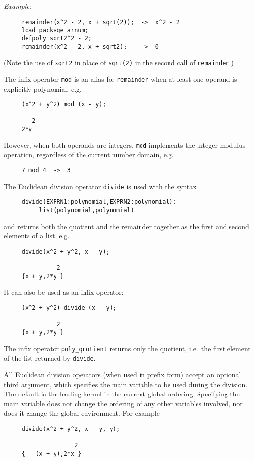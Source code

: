 \textit{Example:}
\begin{verbatim}
     remainder(x^2 - 2, x + sqrt(2));  ->  x^2 - 2
     load_package arnum;
     defpoly sqrt2^2 - 2;
     remainder(x^2 - 2, x + sqrt2);    ->  0
\end{verbatim}
(Note the use of \texttt{sqrt2} in place of \texttt{sqrt(2)} in the
second call of \texttt{remainder}.)

The infix operator \texttt{mod} is an alias for \texttt{remainder}
when at least one operand is explicitly polynomial, e.g.
\begin{verbatim}
     (x^2 + y^2) mod (x - y);

        2
     2*y
\end{verbatim}
However, when both operands are integers, \texttt{mod} implements the
integer modulus operation, regardless of the current number domain,
e.g.
\begin{verbatim}
     7 mod 4  ->  3
\end{verbatim}

The Euclidean division operator \texttt{divide} is used with the syntax
\begin{verbatim}
     divide(EXPRN1:polynomial,EXPRN2:polynomial):
          list(polynomial,polynomial)
\end{verbatim}
and returns both the quotient and the remainder together as the first
and second elements of a list, e.g.
\begin{verbatim}
     divide(x^2 + y^2, x - y);

               2
     {x + y,2*y }
\end{verbatim}
It can also be used as an infix operator:
\begin{verbatim}
     (x^2 + y^2) divide (x - y);

               2
     {x + y,2*y }
\end{verbatim}
The infix operator \texttt{poly\_quotient} returns only the quotient,
i.e.\ the first element of the list returned by \texttt{divide}.

All Euclidean division operators (when used in prefix form) accept an
optional third argument, which specifies the main variable to be used
during the division.  The default is the leading kernel in the current
global ordering.  Specifying the main variable does not change the
ordering of any other variables involved, nor does it change the
global environment.  For example
\begin{verbatim}
     divide(x^2 + y^2, x - y, y);

                    2
     { - (x + y),2*x }
\end{verbatim}

